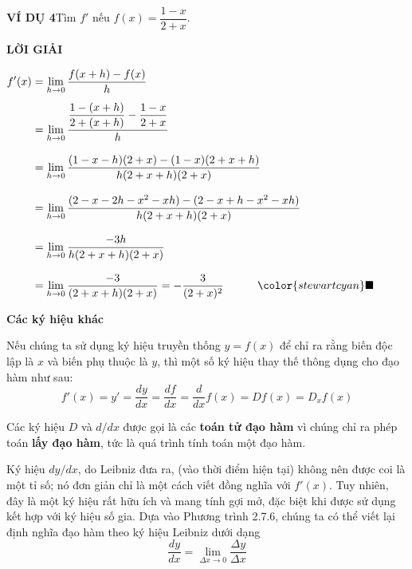 \hfill
\begin{minipage}[t]{0.71\textwidth}
    \vspace{0pt}
    \noindent\textbf{\textsf{\color{stewartcyan}VÍ DỤ 4}}\hspace{1em}Tìm $f'$ nếu $f(x) = \dfrac{1 - x}{2 + x}$.

    \vspace{0.6em}
    \noindent\textbf{\textsf{\color{stewartcyan}LỜI GIẢI}}

    \vspace{0.3em}
    \noindent\hspace{1.5em}$\begin{aligned}
    f'(x) &= \lim_{h \to 0} \frac{f(x + h) - f(x)}{h} \\[4pt]
          &= \lim_{h \to 0} \frac{\dfrac{1 - (x + h)}{2 + (x + h)} - \dfrac{1 - x}{2 + x}}{h} \\[8pt]
          &= \lim_{h \to 0} \frac{(1 - x - h)(2 + x) - (1 - x)(2 + x + h)}{h(2 + x + h)(2 + x)} \\[8pt]
          &= \lim_{h \to 0} \frac{(2 - x - 2h - x^2 - xh) - (2 - x + h - x^2 - xh)}{h(2 + x + h)(2 + x)} \\[8pt]
          &= \lim_{h \to 0} \frac{-3h}{h(2 + x + h)(2 + x)} \\[8pt]
          &= \lim_{h \to 0} \frac{-3}{(2 + x + h)(2 + x)} = -\frac{3}{(2 + x)^2} \qquad\quad {\color{stewartcyan}\blacksquare}
    \end{aligned}$

    \vspace{1.2em}
    \noindent{\color{stewartcyan}\rule{1.1ex}{1.1ex}}\hspace{0.5em}\textbf{\textsf{\large Các ký hiệu khác}}

    \vspace{0.4em}
    \noindent Nếu chúng ta sử dụng ký hiệu truyền thống $y = f(x)$ để chỉ ra rằng biến độc lập là $x$ và biến phụ thuộc là $y$, thì một số ký hiệu thay thế thông dụng cho đạo hàm như sau:
    \[
    f'(x) = y' = \frac{dy}{dx} = \frac{df}{dx} = \frac{d}{dx}f(x) = Df(x) = D_x f(x)
    \]

    \noindent Các ký hiệu $D$ và $d/dx$ được gọi là các \textbf{toán tử đạo hàm} vì chúng chỉ ra phép toán \textbf{lấy đạo hàm}, tức là quá trình tính toán một đạo hàm.

    \vspace{0.4em}
    \noindent Ký hiệu $dy/dx$, do Leibniz đưa ra, (vào thời điểm hiện tại) không nên được coi là một tỉ số; nó đơn giản chỉ là một cách viết đồng nghĩa với $f'(x)$. Tuy nhiên, đây là một ký hiệu rất hữu ích và mang tính gợi mở, đặc biệt khi được sử dụng kết hợp với ký hiệu số gia. Dựa vào Phương trình 2.7.6, chúng ta có thể viết lại định nghĩa đạo hàm theo ký hiệu Leibniz dưới dạng
    \[
    \frac{dy}{dx} = \lim_{\Delta x \to 0} \frac{\Delta y}{\Delta x}
    \]


\end{minipage}

